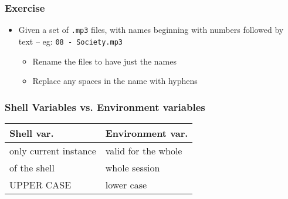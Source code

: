 \documentclass[17pt,compress]{beamer}
\begin{document}
\begin{frame}[fragile]
  \frametitle{Exercise}
\begin{itemize}
\item Given a set of \texttt{.mp3} files, with names beginning with numbers 
      followed by text -- eg: \texttt{08 - Society.mp3}

\begin{itemize}
\item Rename the files to have just the names
\item Replace any spaces in the name with hyphens
\end{itemize}
\end{itemize}
\end{frame}


\begin{frame}[fragile]
  \frametitle{Shell Variables vs. Environment variables}
\begin{table}
\begin{tabular}{|l|l|}
\hline
Shell var. & Environment var.\\\hline
only current instance & valid for the whole\\
of the shell & whole session\\\hline
UPPER CASE & lower case\\\hline
\end{tabular}
\end{table}
\end{frame}
\end{document}
